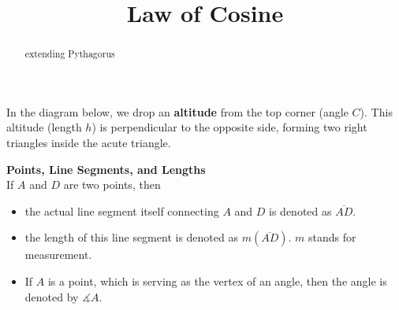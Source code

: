\documentclass{ximera}
\title{Law of Cosine}
\begin{document}
\begin{abstract}
extending Pythagorus
\end{abstract}
\maketitle







In the diagram below, we drop an \textbf{altitude} from the top corner (angle $C$). This altitude (length $h$) is perpendicular to the opposite side, forming two right triangles inside the acute triangle. \\




\begin{image}[3in]
  \end{image}




\begin{notation} \textbf{\textcolor{purple!85!blue}{Points, Line Segments, and Lengths}}  \\

If $A$ and $D$ are two points, then 

\begin{itemize}
\item the actual line segment itself connecting $A$ and $D$ is denoted as $\overline{AD}$. 
\item the length of this line segment is denoted as $m(\overline{AD})$.  $m$ stands for measurement.
\item If $A$ is a point, which is serving as the vertex of an angle, then the angle is denoted by $\measuredangle A$.
\end{itemize}
\end{notation}
\end{document}
